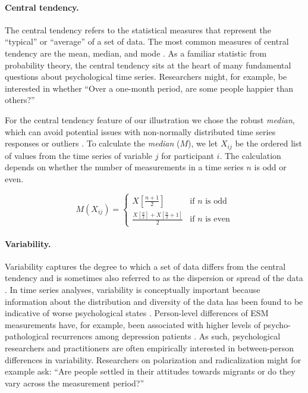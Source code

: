 \paragraph{Central tendency.}

The central tendency refers to the statistical measures that represent
the ``typical'' or ``average'' of a set of data. The most common
measures of central tendency are the mean, median, and mode
\citep{weisberg1992}. As a familiar statistic from probability theory,
the central tendency sits at the heart of many fundamental questions
about psychological time series. Researchers might, for example, be
interested in whether ``Over a one-month period, are some people happier
than others?''

For the central tendency feature of our illustration we chose the robust
\textit{median}, which can avoid potential issues with non-normally
distributed time series responses or outliers \citep{weisberg1992}. To
calculate the \textit{median} (\(M\)), we let \(X_{ij}\) be the ordered
list of values from the time series of variable \(j\) for participant
\(i\). The calculation depends on whether the number of measurements in
a time series \(n\) is odd or even.

\begin{equation} \label{eq:median}
  M(X_{ij}) = 
    \begin{cases}
      X \left[ \frac{n+1}{2} \right] & \text{if $n$ is odd} \\
      \frac{X \left[ \frac{n}{2} \right] + X \left[ \frac{n}{2} +1 \right]}{2} & \text{if $n$ is even}
    \end{cases}
\end{equation}

\paragraph{Variability.}

Variability captures the degree to which a set of data differs from the
central tendency and is sometimes also referred to as the dispersion or
spread of the data \citep{weisberg1992}. In time series analyses,
variability is conceptually important because information about the
distribution and diversity of the data has been found to be indicative
of worse psychological states \citep{myin-germeys2018, helmich2021}.
Person-level differences of ESM measurements have, for example, been
associated with higher levels of psycho-pathological recurrences among
depression patients \citep{timm2017}. As such, psychological researchers
and practitioners are often empirically interested in between-person
differences in variability. Researchers on polarization and
radicalization might for example ask: ``Are people settled in their
attitudes towards migrants or do they vary across the measurement
period?''

